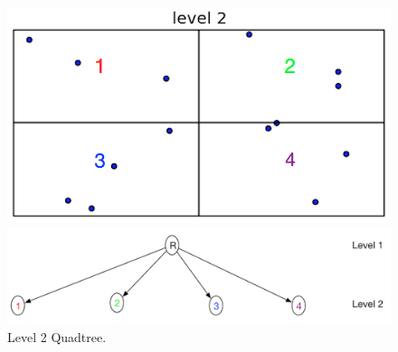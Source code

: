\begin{figure}[H]
  \centering
  \vspace{0.5in}
  \begin{minipage}[b]{0.35\textwidth}
    \includegraphics[width=\textwidth]{Images/Quadtree_basic_scenario7}
  \end{minipage}
  \hfill
  \begin{minipage}[b]{0.6\textwidth}
    \includegraphics[width=\textwidth]{Images/L2_Tree}
  \end{minipage}
  \vspace{0.5in}
  \caption{Level 2 Quadtree.}
  \label{fig:level2quadtree}
\end{figure}

